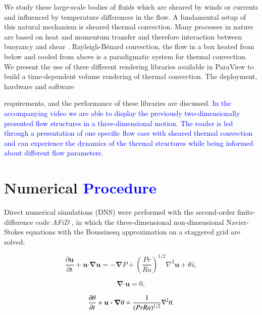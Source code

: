 \documentclass[5p,times]{elsarticle}
\begin{document}
We study these large-scale bodies of fluids which are sheared by winds or currents and influenced by temperature differences in the flow. A fundamental setup of this natural mechanism is sheared thermal convection. Many processes in nature are based on heat and momentum transfer and therefore interaction between buoyancy \cite{ahl09,loh10} and shear \cite{smi11,bar07}. Rayleigh-B\'enard convection, the flow in a box heated from below and cooled from above is a paradigmatic system for thermal convection. We present the use of three different rendering libraries available in ParaView {} to build a time-dependent volume rendering of thermal convection. The deployment, hardware and software

requirements, and the performance of these libraries are discussed. \textcolor{blue}{In the accompanying video \cite{fav18} we are able to display the previously two-dimensionally presented flow structures in a three-dimensional motion. The reader is led through a presentation of one specific flow case with sheared thermal convection and can experience the dynamics of the thermal structures while being informed about different flow parameters. }

\section{Numerical \textcolor{blue}{Procedure}}
Direct numerical simulations (DNS) were performed with the second-order finite-difference
code \textit{AFiD} \cite{poe15c}, in which the three-dimensional non-dimensional
Navier-Stokes equations with the Boussinesq approximation on a staggered grid are solved:

\begin{equation} %
\frac{\partial \boldsymbol{u}}{\partial t} + \boldsymbol{u} \bm{\cdot} \bm{\nabla} \boldsymbol{u} =-\bm{\nabla} P + \left(\frac{Pr}{Ra} \right)^{1/2} \nabla^2\boldsymbol{u}+\theta \hat{z}, 
\label{eqn:NS}
\end{equation}

\begin{equation} %
\bm{\nabla} \bm{\cdot} \boldsymbol{u} =0,
\label{eqn:div}
\end{equation}

\begin{equation} %
\frac{\partial \theta}{\partial t} + \boldsymbol{u} \bm{\cdot} \bm{\nabla} \theta = \frac{1}{(Pr Ra)^{1/2}} \nabla ^2 \theta.
\label{eqn:temp} \\[8pt]
\end{equation}
\end{document}

